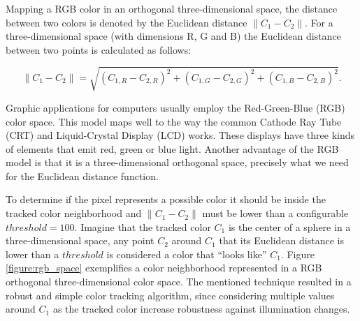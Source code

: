 Mapping a RGB color in an orthogonal three-dimensional space, the distance between two colors is denoted by the Euclidean distance $\|C_1-C_2\|$. For a three-dimensional space (with dimensions R, G and B) the Euclidean distance between two points is calculated as follows:

$$\|C_1-C_2\|=\sqrt{(C_{1,R}-C_{2,R})^2 + (C_{1,G}-C_{2,G})^2 + (C_{1,B}-C_{2,B})^2}.$$

Graphic applications for computers usually employ the Red-Green-Blue (RGB) color space. This model maps well to the way the common Cathode Ray Tube (CRT) and Liquid-Crystal Display (LCD) works. These displays have three kinds of elements that emit red, green or blue light. Another advantage of the RGB model is that it is a three-dimensional orthogonal space, precisely what we need for the Euclidean distance function.

To determine if the pixel represents a possible color it should be inside the tracked color neighborhood and $\|C_1-C_2\|$ must be lower than a configurable $threshold=100$. Imagine that the tracked color $C_1$ is the center of a sphere in a three-dimensional space, any point $C_2$ around $C_1$ that its Euclidean distance is lower than a $threshold$ is considered a color that ``looks like'' $C_1$. Figure \ref{figure:rgb_space} exemplifies a color neighborhood represented in a RGB orthogonal three-dimensional color space. The mentioned technique resulted in a robust and simple color tracking algorithm, since considering multiple values around $C_1$ as the tracked color increase robustness against illumination changes.

